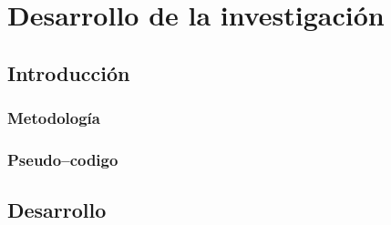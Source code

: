 \chapter{Desarrollo de la investigaci\'{o}n}
\label{sec:chapter4}

\section{Introducci\'{o}n}




\subsection{Metodolog\'ia}
\label{subsec:411metodologia}




\subsection{Pseudo--codigo}
\label{subsec:422pseudocodigo}



\section{Desarrollo}



